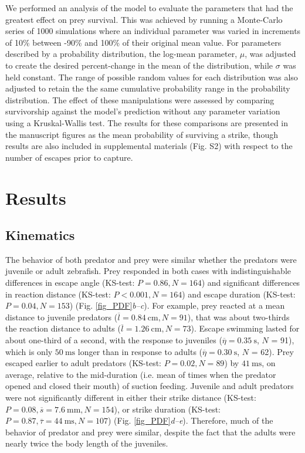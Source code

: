 \documentclass[]{rsos}%
\begin{document}
We performed an analysis of the model to evaluate the parameters that had the greatest effect on prey survival. 
This was achieved by running a Monte-Carlo series of 1000 simulations where an individual parameter was varied in increments of 10\% between -90\% and 100\% of their original mean value.
For parameters described by a probability distribution, the log-mean parameter, $\mu$, was adjusted to create the desired percent-change in the mean of the distribution, while $\sigma$ was held constant.
The range of possible random values for each distribution was also adjusted to retain the the same cumulative probability range in the probability distribution.
The effect of these manipulations were assessed by comparing survivorship against the model's prediction without any parameter variation using a Kruskal-Wallis test. 
The results for these comparisons are presented in the manuscript figures as the mean probability of surviving a strike, though results are also included in supplemental materials (Fig. S2) with respect to the number of escapes prior to capture.


\section{Results} %

\subsection{Kinematics} %
The behavior of both predator and prey were similar whether the predators were juvenile or adult zebrafish.
Prey responded in both cases with indistinguishable differences in escape angle (KS-test: $P = 0.86, N = 164$) and significant differences in reaction distance (KS-test: $P < 0.001, N = 164$) and escape duration (KS-test: $P = 0.04, N = 153$) (Fig. \ref{fig_PDF}\textit{b--c}). 
For example, prey reacted at a mean distance to juvenile predators ($\overline{l} = \SI{0.84}{\cm}, N = 91$), that was about two-thirds the reaction distance to adults ($\overline{l} = \SI{1.26}{\cm}, N = 73$).
Escape swimming lasted for about one-third of a second, with the response to juveniles ($\overline{\eta} = \SI{0.35}{\s}$, $N$ = 91), which is only $\SI{50}{\ms}$ longer than in response to adults ($\overline{\eta} = \SI{0.30}{\s}$, $N$ = 62).
Prey escaped earlier to adult predators (KS-test: $P = 0.02, N = 89$) by $\SI{41}{\ms}$, on average, relative to the mid-duration (i.e. mean of times when the predator opened and closed their mouth) of suction feeding.
Juvenile and adult predators were not significantly different in either their strike distance (KS-test: $P = 0.08, \overline{s} = \SI{7.6}{\mm}, N = 154$), or strike duration (KS-test: $P = 0.87, \overline{\tau} = \SI{44}{\ms}, N = 107$) (Fig. \ref{fig_PDF}\textit{d--e}).
Therefore, much of the behavior of predator and prey were similar, despite the fact that the adults were nearly twice the body length of the juveniles.
\end{document}

